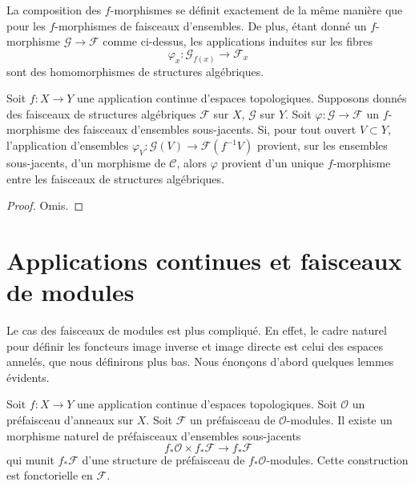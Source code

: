 \medskip\noindent
La composition des $f$-morphismes se définit exactement de la
même manière que pour les $f$-morphismes de faisceaux
d'ensembles. De plus, étant donné un $f$-morphisme $\mathcal{G} \to \mathcal{F}$
comme ci-dessus, les applications induites sur les fibres
$$
\varphi_x : \mathcal{G}_{f(x)} \longrightarrow \mathcal{F}_x
$$
sont des homomorphismes de structures algébriques.


\begin{lemma}
\label{lemma-f-map-sets-algebraic-structures}
Soit $f : X \to Y$ une application continue d'espaces topologiques.
Supposons donnés des faisceaux de structures algébriques
$\mathcal{F}$ sur $X$, $\mathcal{G}$ sur $Y$. Soit
$\varphi : \mathcal{G} \to \mathcal{F}$ un $f$-morphisme
des faisceaux d'ensembles sous-jacents. Si, pour tout ouvert $V \subset Y$,
l'application d'ensembles $\varphi_V : \mathcal{G}(V) \to \mathcal{F}(f^{-1}V)$
provient, sur les ensembles sous-jacents, d'un morphisme de $\mathcal{C}$,
alors $\varphi$ provient d'un unique $f$-morphisme entre
les faisceaux de structures algébriques.
\end{lemma}

\begin{proof}
Omis.
\end{proof}




\section{Applications continues et faisceaux de modules}
\label{section-presheaves-modules-functorial}

\noindent
Le cas des faisceaux de modules est plus compliqué.
En effet, le cadre naturel pour définir
les foncteurs image inverse et image directe est celui
des espaces annelés, que nous définirons plus bas. Nous
énonçons d'abord quelques lemmes évidents.

\begin{lemma}
\label{lemma-pushforward-presheaf-module}
Soit $f : X \to Y$ une application continue d'espaces topologiques.
Soit $\mathcal{O}$ un préfaisceau d'anneaux sur $X$. Soit
$\mathcal{F}$ un préfaisceau de $\mathcal{O}$-modules.
Il existe un morphisme naturel de préfaisceaux d'ensembles sous-jacents
$$
f_*\mathcal{O} \times f_*\mathcal{F}
\longrightarrow
f_*\mathcal{F}
$$
qui munit $f_*\mathcal{F}$ d'une structure de préfaisceau de
$f_*\mathcal{O}$-modules. Cette construction est
fonctorielle en $\mathcal{F}$.
\end{lemma}

